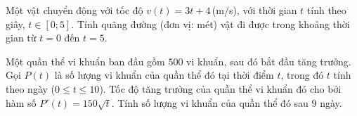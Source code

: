 \begin{bt}%
Một vật chuyển động với tốc độ $v(t)=3t+4$\,(m/s), với thời gian $t$ tính theo giây, $t\in[0;5]$. Tính quãng đường (đơn vị: mét) vật đi được trong khoảng thời gian từ $t=0$ đến $t=5$.
\par{}
\end{bt}

\begin{bt}%
	Một quần thể vi khuẩn ban đầu gồm $500$ vi khuẩn, sau đó bắt đầu tăng trưởng. Gọi $P(t)$ là số lượng vi khuẩn của quần thể đó tại thời điểm $t$, trong đó $t$ tính theo ngày ($0 \le t \le 10$). Tốc độ tăng trưởng của quần thể vi khuẩn đó cho bởi hàm số $P'(t) = 150 \sqrt{t}$. Tính số lượng vi khuẩn của quần thể đó sau $9$ ngày.
\end{bt}

